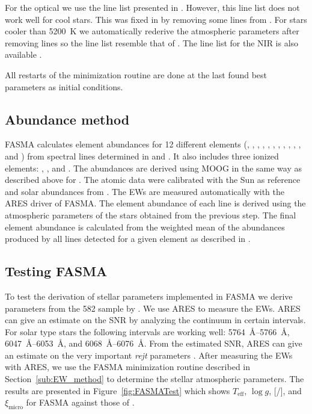 \documentclass{aa}
\begin{document}
For the optical we use the line list presented in \citet{Sousa2008a}. However,
this line list does not work well for cool stars. This was fixed in
\citet{Tsantaki2013} by removing some lines from \citet{Sousa2008a}. For stars
cooler than \SI{5200}{K} we automatically rederive the atmospheric parameters
after removing lines so the line list resemble that of \citet{Tsantaki2013}. The
line list for the NIR is also available \citep{Andreasen2016}.

All restarts of the minimization routine are done at the last found best
parameters as initial conditions.


\subsection{Abundance method}
\label{sub:Abundance_method}

FASMA calculates element abundances for 12 different elements (,
, , , , , ,
, , , , and ) from spectral
lines determined in \citet{Neves2009} and \citet{Adibekyan2012}. It also
includes three ionized elements: , , and .
The abundances are derived using MOOG in the same way as described above for
. The atomic data were calibrated with the Sun as reference and solar
abundances from \citet{Anders1989}. The EWs are measured automatically with the
ARES driver of FASMA. The element abundance of each line is derived using the
atmospheric parameters of the stars obtained from the previous step. The final
element abundance is calculated from the weighted mean of the abundances
produced by all lines detected for a given element as described in
\citet{Adibekyan2015b}.


\subsection{Testing FASMA}
\label{sub:Testing_FASMA}

To test the derivation of stellar parameters implemented in FASMA we derive
parameters from the 582 sample by \citet{Sousa2011}. We use ARES to measure the
EWs. ARES can give an estimate on the SNR by analyzing the continuum in certain
intervals. For solar type stars the following intervals are working well:
\SIrange{5764}{5766}{\angstrom}, \SIrange{6047}{6053}{\angstrom}, and
\SIrange{6068}{6076}{\angstrom}. From the estimated SNR, ARES can give an
estimate on the very important \emph{rejt} parameters
\citep[see][for more information]{Sousa2015a}. After measuring the EWs with ARES,
we use the FASMA minimization routine described in Section~\ref{sub:EW_method}
to determine the stellar atmospheric parameters. The results are presented in
Figure~\ref{fig:FASMATest} which shows $T_\mathrm{eff}$, $\log g$,
[/], and $\xi_\mathrm{micro}$ for FASMA against those of
\citet{Sousa2011}.
\end{document}
